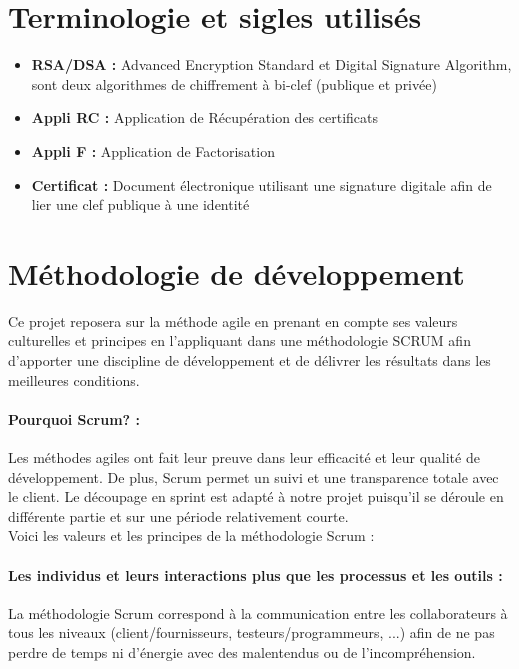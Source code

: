 \documentclass[a4paper,11pt,french]{article}
\begin{document}
\section{Terminologie et sigles utilisés}
\begin{itemize}
	\item \textbf{RSA/DSA :}  Advanced Encryption Standard et Digital Signature Algorithm, sont deux algorithmes de chiffrement à bi-clef (publique et privée)
	\item \textbf{Appli RC :} Application de Récupération des certificats
	\item \textbf{Appli F :} Application de Factorisation
	\item \textbf{Certificat :} Document électronique utilisant une signature digitale afin de lier une clef publique à une identité
\end{itemize}

\newpage

\section{Méthodologie de développement}

Ce projet reposera sur la méthode agile en prenant en compte ses valeurs culturelles et principes en l'appliquant dans une méthodologie SCRUM afin d'apporter une discipline de développement et de délivrer les résultats dans les meilleures conditions.

\paragraph{Pourquoi Scrum? :} Les méthodes agiles ont fait leur preuve dans leur efficacité et leur qualité de développement. De plus, Scrum permet un suivi et une transparence totale avec le client. Le découpage en sprint est adapté à notre projet puisqu'il se déroule en différente partie et sur une période relativement courte. \\

Voici les valeurs et les principes de la méthodologie Scrum : 
\paragraph{Les individus et leurs interactions plus que les processus et les outils :} 
La méthodologie Scrum correspond à la communication entre les collaborateurs à tous les niveaux (client/fournisseurs, testeurs/programmeurs, ...) afin de ne pas perdre de temps ni d'énergie avec des malentendus ou de l'incompréhension.
\end{document}
